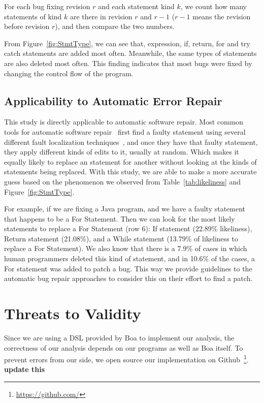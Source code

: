 \documentclass{sig-alternate-05-2015}
\newcommand{\todo}[1]
  {{\scriptsize \textbf{\color{red} {#1}}}}
\begin{document}
For each bug fixing revision $r$ and each statement kind $k$, we count how many
statements of kind $k$ are there in revision $r$ and $r-1$ ($r-1$ means the
revision before revision $r$), and then compare the two numbers. 

From Figure~\ref{fig:StmtType}, we can see that, expression, if, return, for and
try catch statements are added most often. Meanwhile, the same types of
statements are also deleted most often. This finding indicates that most bugs
were fixed by changing the control flow of the program.


\subsection{Applicability to Automatic Error Repair} 

This study is directly applicable to automatic software repair. Most common
tools for automatic software repair~\cite{kim2013,weimer2009,legoues2012} first
find a faulty statement using several different fault localization
techniques~\cite{fry2010}, and once they have that faulty statement, they apply
different kinds of edits to it, usually at random. Which makes it equally likely
to replace an statement for another without looking at the kinds of statements
being replaced. With this study, we are able to make a more accurate guess based
on the phenomenon we observed from Table~\ref{tab:likeliness} and
Figure~\ref{fig:StmtType}.

For example, if we are fixing a Java program, and we have a faulty statement
that happens to be a For Statement. Then we can look for the most likely
statements to replace a For Statement (row 6): If statement (22.89\%
likeliness), Return statement (21.08\%), and a While statement (13.79\% of
likeliness to replace a For Statement). We also know that there is a 7.9\% of
cases in which human programmers deleted this kind of statement, and in 10.6\%
of the cases, a For statement was added to patch a bug. This way we provide
guidelines to the automatic bug repair approaches to consider this on their
effort to find a patch.

\section{Threats to Validity} 

Since we are using a DSL provided by Boa to implement our analysis, the
correctness of our analysis depends on our programs as well as Boa itself. To
prevent errors from our side, we open source our implementation on
Github~\footnote{\url{https://github.com/}}.\todo{update
this}
\end{document}
